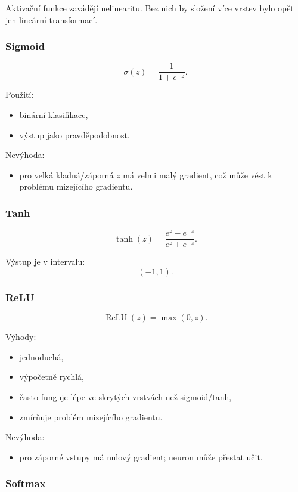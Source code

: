 Aktivační funkce zavádějí nelinearitu. Bez nich by složení více vrstev bylo opět jen lineární transformací.

\subsubsection{Sigmoid}

\[
\sigma(z)=\frac{1}{1+e^{-z}}.
\]

Použití:
\begin{itemize}
    \item binární klasifikace,
    \item výstup jako pravděpodobnost.
\end{itemize}

Nevýhoda:
\begin{itemize}
    \item pro velká kladná/záporná $z$ má velmi malý gradient, což může vést k problému mizejícího gradientu.
\end{itemize}

\subsubsection{Tanh}

\[
\tanh(z)=\frac{e^z-e^{-z}}{e^z+e^{-z}}.
\]

Výstup je v intervalu:
\[
(-1,1).
\]

\subsubsection{ReLU}

\[
\operatorname{ReLU}(z)=\max(0,z).
\]

Výhody:
\begin{itemize}
    \item jednoduchá,
    \item výpočetně rychlá,
    \item často funguje lépe ve skrytých vrstvách než sigmoid/tanh,
    \item zmírňuje problém mizejícího gradientu.
\end{itemize}

Nevýhoda:
\begin{itemize}
    \item pro záporné vstupy má nulový gradient; neuron může přestat učit.
\end{itemize}

\subsubsection{Softmax}

